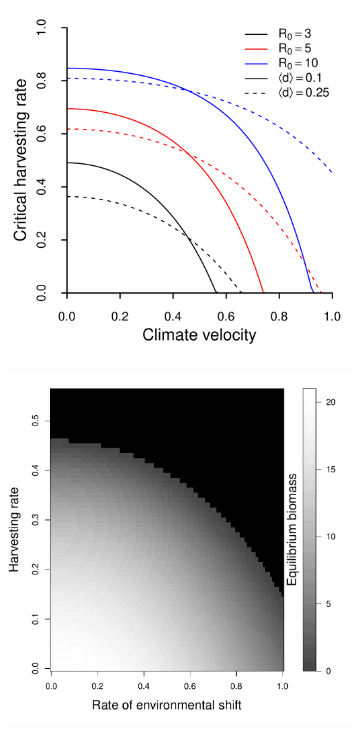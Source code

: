 \documentclass[12pt,english]{article}
\begin{document}
\begin{spacing}{1.9}
\begin{figure}[htbp]
\begin{subfigure}{3in}
\subcaption{\label{rates}}
\includegraphics[width=\textwidth]{plots/critical_rates.pdf}
\end{subfigure}
\begin{subfigure}{3in}
\subcaption{\label{biomass}}
\includegraphics[width=\textwidth]{plots/eqbiomass.pdf}
\end{subfigure}


\end{figure}
\end{spacing}
\end{document}
